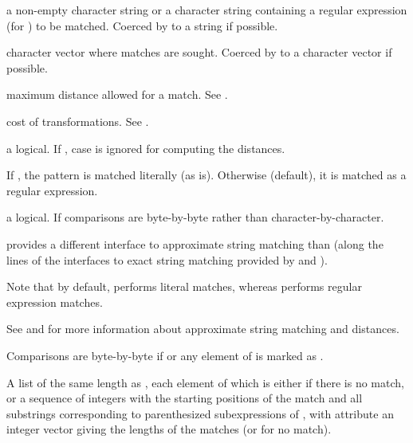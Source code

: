 %
\begin{Arguments}
\begin{ldescription}
\item[\code{pattern}] a non-empty character string or a character string
containing a regular expression (for ) to be
matched.
Coerced by  to a string if possible.
\item[\code{text}] character vector where matches are sought.
Coerced by  to a character vector if
possible.
\item[\code{max.distance}] maximum distance allowed for a match.
See .
\item[\code{costs}] cost of transformations.
See .
\item[\code{ignore.case}] a logical.  If , case is ignored for
computing the distances.
\item[\code{fixed}] If , the pattern is matched literally (as is).
Otherwise (default), it is matched as a regular expression.
\item[\code{useBytes}] a logical.  If  comparisons are
byte-by-byte rather than character-by-character.
\end{ldescription}
\end{Arguments}
%
\begin{Details}\relax
{} provides a different interface to approximate string
matching than  (along the lines of the interfaces
to exact string matching provided by  and
).

Note that by default,  performs literal matches, 
whereas  performs regular expression matches.

See  and  for more information
about approximate string matching and distances.

Comparisons are byte-by-byte if  or any element of
 is marked as .
\end{Details}
%
\begin{Value}
A list of the same length as , each element of which is
either  if there is no match, or a sequence of integers with
the starting positions of the match and all substrings corresponding
to parenthesized subexpressions of , with attribute
 an integer vector giving the lengths of the
matches (or  for no match).
\end{Value}
